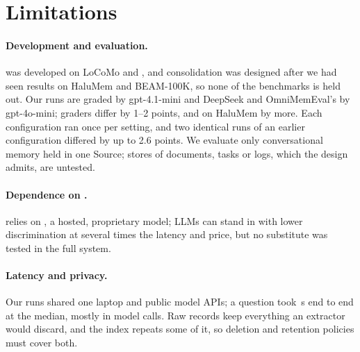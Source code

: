 \section{Limitations}
\label{sec:limitations}

\paragraph{Development and evaluation.}
\sys{} was developed on LoCoMo and \lme, and consolidation was designed after we had seen results on HaluMem and BEAM-100K, so none of the benchmarks is held out.
Our runs are graded by gpt-4.1-mini and DeepSeek and OmniMemEval's by gpt-4o-mini; graders differ by 1--2 points, and on HaluMem by more.
Each configuration ran once per setting, and two identical runs of an earlier configuration differed by up to 2.6 points.
We evaluate only conversational memory held in one Source; stores of documents, tasks or logs, which the design admits, are untested.

\paragraph{Dependence on \jev.}
\sys{} relies on \jev, a hosted, proprietary model; LLMs can stand in with lower discrimination at several times the latency and price, but no substitute was tested in the full system.

\paragraph{Latency and privacy.}
Our runs shared one laptop and public model APIs; a question took \workMeasured\,s end to end at the median, mostly in model calls.
Raw records keep everything an extractor would discard, and the index repeats some of it, so deletion and retention policies must cover both.
